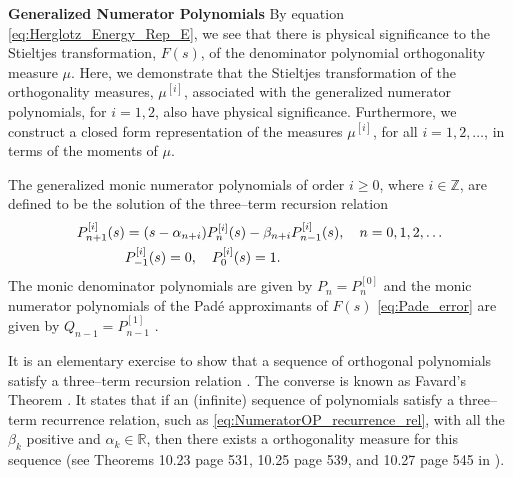 \documentclass[english,12pt]{ttuthes}
\begin{document}
\noindent \textbf{Generalized Numerator Polynomials}\newline
%
By equation \eqref{eq:Herglotz_Energy_Rep_E}, we see that there is
physical significance to the Stieltjes transformation, $F(s)$, of the
denominator polynomial orthogonality measure $\mu$. Here, we
demonstrate that the Stieltjes transformation of the orthogonality
measures, $\mu^{[i]}$, associated with the generalized numerator
polynomials, for $i=1,2$, also have physical
significance. Furthermore, we construct a closed form representation
of the measures $\mu^{[i]}$, for all $i=1,2,\ldots$, in terms of the
moments of $\mu$.   

The generalized monic numerator polynomials of order
$i\geq0$, where $i\in\mathbb{Z}$, are defined to be the solution of the
three--term recursion relation
\cite{Gautschi:2004:OP,Assche:JCAM:1991:237}     
%
\begin{align}\label{eq:NumeratorOP_recurrence_rel}
  P^{[i]}_{n+1}(s)&=(s-\alpha_{n+i})P^{[i]}_{n}(s)-\beta_{n+i}P^{[i]}_{n-1}(s),
                            \quad n=0,1,2,\ldots\\
  &P^{[i]}_{-1}(s)=0, \quad  P^{[i]}_{0}(s)=1.\notag
\end{align}
%
The monic denominator polynomials are given by $P_n=P^{[0]}_n$ and the
monic numerator polynomials of the Pad\'{e} approximants of $F(s)$
\eqref{eq:Pade_error} are given by $Q_{n-1}=P^{[1]}_{n-1}$
\cite{Gautschi:2004:OP,Assche:JCAM:1991:237}.

It is an elementary exercise to show that a sequence of orthogonal
polynomials satisfy a three--term recursion relation
\cite{Gautschi:2004:OP,Deift:2000:RMT,Ismail:2005}. The converse is
known as Favard's Theorem \cite{Gautschi:2004:OP}. It states that if
an (infinite) sequence of polynomials satisfy a three--term recurrence
relation, such as \eqref{eq:NumeratorOP_recurrence_rel}, with all the
$\beta_k$ positive and $\alpha_k\in\mathbb{R}$, then there exists a orthogonality
measure for this sequence (see Theorems 10.23 page 531, 10.25 page
539, and 10.27 page 545 in \cite{Stone:64}).
\end{document}
